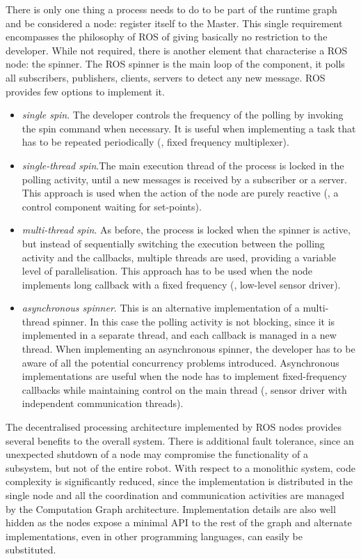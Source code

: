 There is only one thing a process needs to do to be part of the runtime graph and be considered a node: register itself to the Master. This single requirement encompasses the philosophy of ROS of giving basically no restriction to the developer. While not required, there is another element that characterise a ROS node: the spinner. The ROS spinner is the main loop of the component, it polls all subscribers, publishers, clients, servers to detect any new message. ROS provides few options to implement it.
\begin{itemize}
\item \textit{single spin}. The developer controls the frequency of the polling by invoking the spin command when necessary. It is useful when implementing a task that has to be repeated periodically (\eg, fixed frequency multiplexer).
\item \textit{single-thread spin}.The main execution thread of the process is locked in the polling activity, until a new messages is received by a subscriber or a server. This approach is used when the action of the node are purely reactive (\eg, a control component waiting for set-points).
\item \textit{multi-thread spin}. As before, the process is locked when the spinner is active, but instead of sequentially switching the execution between the polling activity and the callbacks, multiple threads are used, providing a variable level of parallelisation. This approach has to be used when the node implements long callback with a fixed frequency (\eg, low-level sensor driver).
\item \textit{asynchronous spinner}. This is an alternative implementation of a multi-thread spinner. In this case the polling activity is not blocking, since it is implemented in a separate thread, and each callback is managed in a new thread. When implementing an asynchronous spinner, the developer has to be aware of all the potential concurrency problems introduced. Asynchronous implementations are useful when the node has to implement fixed-frequency callbacks while maintaining control on the main thread (\eg, sensor driver with independent communication threads).
\end{itemize}

The decentralised processing architecture implemented by ROS nodes provides several benefits to the overall system. There is additional fault tolerance, since an unexpected shutdown of a node may compromise the functionality of a subsystem, but not of the entire robot. With respect to a monolithic system, code complexity is significantly reduced, since the implementation is distributed in the single node and all the coordination and communication activities are managed by the Computation Graph architecture. Implementation details are also well hidden as the nodes expose a minimal API to the rest of the graph and alternate implementations, even in other programming languages, can easily be substituted.

